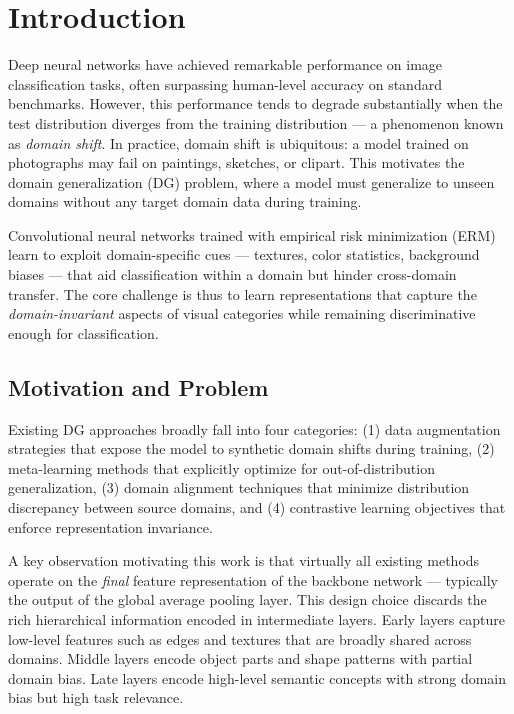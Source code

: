 \documentclass[12pt,a4paper]{article}
\begin{document}
\tableofcontents
\newpage

\section{Introduction}

Deep neural networks have achieved remarkable performance on image classification tasks,
often surpassing human-level accuracy on standard benchmarks. However, this performance
tends to degrade substantially when the test distribution diverges from the training
distribution — a phenomenon known as \emph{domain shift}. In practice, domain shift is
ubiquitous: a model trained on photographs may fail on paintings, sketches, or clipart.
This motivates the domain generalization (DG) problem, where a model must generalize to
unseen domains without any target domain data during training.

Convolutional neural networks trained with empirical risk minimization (ERM) learn to
exploit domain-specific cues — textures, color statistics, background biases — that aid
classification within a domain but hinder cross-domain transfer. The core challenge is
thus to learn representations that capture the \emph{domain-invariant} aspects of visual
categories while remaining discriminative enough for classification.

\subsection{Motivation and Problem}

Existing DG approaches broadly fall into four categories: (1) data augmentation strategies
that expose the model to synthetic domain shifts during training, (2) meta-learning methods
that explicitly optimize for out-of-distribution generalization, (3) domain alignment
techniques that minimize distribution discrepancy between source domains, and (4)
contrastive learning objectives that enforce representation invariance.

A key observation motivating this work is that virtually all existing methods operate on
the \emph{final} feature representation of the backbone network — typically the output of
the global average pooling layer. This design choice discards the rich hierarchical
information encoded in intermediate layers. Early layers capture low-level features such
as edges and textures that are broadly shared across domains. Middle layers encode object
parts and shape patterns with partial domain bias. Late layers encode high-level semantic
concepts with strong domain bias but high task relevance.
\end{document}
